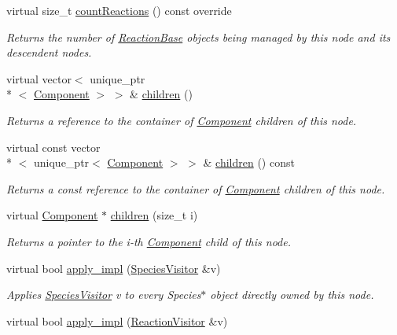 \begin{DoxyCompactItemize}
virtual size\+\_\+t \hyperlink{classComposite_a14108b9a4f9e903ba0fd9cc40fbbd8ae}{count\+Reactions} () const override
\begin{DoxyCompactList}\small\item\em Returns the number of \hyperlink{classReactionBase}{Reaction\+Base} objects being managed by this node and its descendent nodes. \end{DoxyCompactList}\item 
virtual vector$<$ unique\+\_\+ptr\\*
$<$ \hyperlink{classComponent}{Component} $>$ $>$ \& \hyperlink{classComposite_adc22f790bd1f78a4a195a61ae60c0965}{children} ()
\begin{DoxyCompactList}\small\item\em Returns a reference to the container of \hyperlink{classComponent}{Component} children of this node. \end{DoxyCompactList}\item 
virtual const vector\\*
$<$ unique\+\_\+ptr$<$ \hyperlink{classComponent}{Component} $>$ $>$ \& \hyperlink{classComposite_a7824aae77c582d72a2e8b403f2636385}{children} () const 
\begin{DoxyCompactList}\small\item\em Returns a const reference to the container of \hyperlink{classComponent}{Component} children of this node. \end{DoxyCompactList}\item 
virtual \hyperlink{classComponent}{Component} $\ast$ \hyperlink{classComposite_af2073a61c00153c28cab3a29926ea060}{children} (size\+\_\+t i)
\begin{DoxyCompactList}\small\item\em Returns a pointer to the i-\/th \hyperlink{classComponent}{Component} child of this node. \end{DoxyCompactList}\item 
virtual bool \hyperlink{classComponent_a20f6f5a1f7da3238c069dfc35f174a4b}{apply\+\_\+impl} (\hyperlink{classSpeciesVisitor}{Species\+Visitor} \&v)
\begin{DoxyCompactList}\small\item\em Applies \hyperlink{classSpeciesVisitor}{Species\+Visitor} v to every Species$\ast$ object directly owned by this node. \end{DoxyCompactList}\item 
virtual bool \hyperlink{classComponent_ac9296f41e0b9c254d5adea9df3b4b07a}{apply\+\_\+impl} (\hyperlink{classReactionVisitor}{Reaction\+Visitor} \&v)

\end{DoxyCompactItemize}
